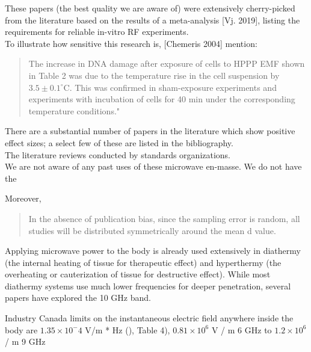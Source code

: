 \documentclass[fleqn,10pt]{article}
\begin{document}
\begin{autem}

These papers (the best quality we are aware of) were extensively cherry-picked from the literature based on the results of a meta-analysis [Vj. 2019], listing the requirements for reliable in-vitro RF experiments.\\

To illustrate how sensitive this research is, [Chemeris 2004] mention:

\begin{quote}

The increase in DNA damage after exposure of cells to HPPP EMF shown in Table 2 was due to the temperature rise in the cell suspension by $3.5\pm0.1^{\circ}  $C. This was confirmed in sham-exposure experiments and experiments with incubation of cells for 40 min under the corresponding temperature conditions."

\end{quote}

There are a substantial number of papers in the literature which show positive effect sizes; a select few of these are listed in the bibliography. \\

The literature reviews conducted by standards organizations.\\

We are not aware of any past uses of these microwave en-masse. We do not have the 

Moreover, 
\begin{quote}
	
In the absence of publication bias, since the sampling error is random, all studies will be distributed symmetrically around the mean d value.

\end{quote}


\end{autem}

Applying microwave power to the body is already used extensively in diathermy (the internal heating of tissue for therapeutic effect) and hyperthermy (the overheating or cauterization of tissue for destructive effect). While most diathermy systems use much lower frequencies for deeper penetration, several papers have explored the 10 GHz band. 

Industry Canada limits on the instantaneous electric field anywhere inside the body are $1.35 \times 10^-4$ V/m * Hz ()\cite{RSS1022015}, Table 4), $0.81 \times 10^6$ V / m \@ 6 GHz to $1.2 \times 10^6$ / m \@ 9 GHz
\end{document}
